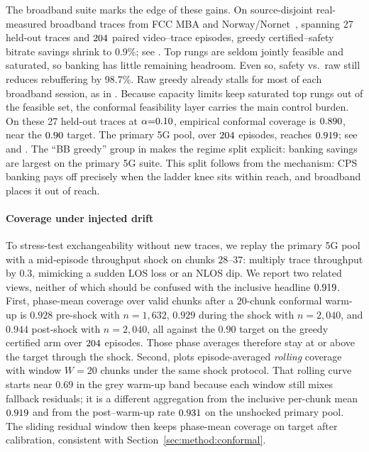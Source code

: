 The broadband suite marks the edge of these gains. On source-disjoint real-measured broadband traces from FCC MBA and Norway/Nornet~\cite{fcc2015mba,kvalbein2014}, spanning 27 held-out traces and \(\CPSepisodes\) paired video--trace episodes, greedy certified--safety bitrate savings shrink to 0.9\%; see . Top rungs are seldom jointly feasible and saturated, so banking has little remaining headroom.
Even so, safety vs.\ raw still reduces rebuffering by 98.7\%. Raw greedy already stalls for most of each broadband session, as in .
Because capacity limits keep saturated top rungs out of the feasible set, the conformal feasibility layer carries the main control burden.
On these 27 held-out traces at \(\alpha{=}\CPSalpha\), empirical conformal coverage is \(0.890\), near the \(0.90\) target. The primary \mbox{5G} pool, over \(\CPSepisodes\) episodes, reaches \(0.919\); see  and .
The ``BB greedy'' group in  makes the regime split explicit: banking savings are largest on the primary \mbox{5G} suite.
This split follows from the mechanism: CPS banking pays off precisely when the ladder knee sits within reach, and broadband places it out of reach.

\begin{cps@table}
  \centering
  \caption{Paired greedy arms on real broadband traces (\(\CPSepisodes\) episodes over 27 held-out FCC/Norway traces, \(\varepsilon{=}\CPSepsilon\), \(\alpha{=}\CPSalpha\)).}
  \label{tab:cps:bb}
  \small
  \evaltable{}
\end{cps@table}

\paragraph{Coverage under injected drift}
To stress-test exchangeability without new traces, we replay the primary \mbox{5G} pool with a mid-episode throughput shock on chunks \(28\)--\(37\): multiply trace throughput by \(0.3\), mimicking a sudden LOS loss or an NLOS dip.
We report two related views, neither of which should be confused with the inclusive headline \(0.919\).
First, phase-mean coverage over valid chunks after a \(20\)-chunk conformal warm-up is \(0.928\) pre-shock with \(n{=}1{,}632\), \(0.929\) during the shock with \(n{=}2{,}040\), and \(0.944\) post-shock with \(n{=}2{,}040\), all against the \(0.90\) target on the greedy certified arm over \(\CPSepisodes\) episodes.
Those phase averages therefore stay at or above the target through the shock.
Second,  plots episode-averaged \emph{rolling} coverage with window \(W{=}20\) chunks under the same shock protocol.
That rolling curve starts near \(0.69\) in the grey warm-up band because each window still mixes fallback residuals; it is a different aggregation from the inclusive per-chunk mean \(0.919\) and from the post--warm-up rate \(0.931\) on the unshocked primary pool.
The sliding residual window then keeps phase-mean coverage on target after calibration, consistent with Section~\ref{sec:method:conformal}.

